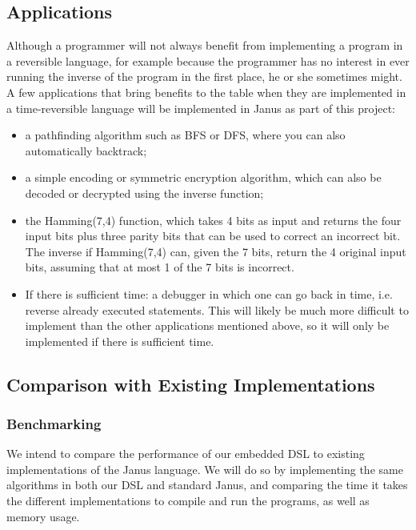 \documentclass[12pt,a4paper]{article}
\begin{document}
	\subsection{Applications}
	Although a programmer will not always benefit from implementing a program in a reversible language, for example because the programmer has no interest in ever running the inverse of the program in the first place, he or she sometimes might. A few applications that bring benefits to the table when they are implemented in a time-reversible language will be implemented in Janus as part of this project:
	\begin{itemize}
		\item
			a pathfinding algorithm such as BFS or DFS, where you can also automatically backtrack;
	        \item
	        		a simple encoding or symmetric encryption algorithm, which can also be decoded or decrypted using the inverse function;
	        	\item
			the Hamming(7,4) function, which takes 4 bits as input and returns the four input bits plus three parity bits that can be used to correct an incorrect bit\cite{hamming1950error}. The inverse if Hamming(7,4) can, given the 7 bits, return the 4 original input bits, assuming that at most 1 of the 7 bits is incorrect.
        		\item
			If there is sufficient time: a debugger in which one can go back in time, i.e. reverse already executed statements. This will likely be much more difficult to implement than the other applications mentioned above, so it will only be implemented if there is sufficient time.
	\end{itemize}
	
	\subsection{Comparison with Existing Implementations}
    \subsubsection{Benchmarking}
    We intend to compare the performance of our embedded DSL to existing implementations of the Janus language. We will do so by implementing the same algorithms in both our DSL and standard Janus, and comparing the time it takes the different implementations to compile and run the programs, as well as memory usage.
\end{document}
